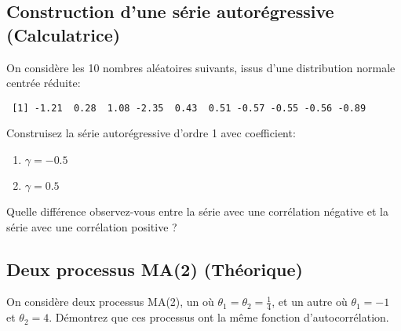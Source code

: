 \documentclass[11pt,english,francais]{article}
\begin{document}
\subsection{Construction d'une série autorégressive (Calculatrice)}
\label{sec:constr-dune-serie}

On considère les 10 nombres aléatoires suivants, issus d'une distribution normale centrée réduite:

\begin{verbatim}
 [1] -1.21  0.28  1.08 -2.35  0.43  0.51 -0.57 -0.55 -0.56 -0.89
\end{verbatim}

Construisez la série autorégressive d'ordre 1 avec coefficient: 
\begin{enumerate}
\item $\gamma = -0.5$
\item $\gamma = 0.5$
\end{enumerate}

Quelle différence observez-vous entre la série avec une corrélation négative et la série avec une corrélation positive ?

\subsection{Deux processus MA(2) (Théorique)}

On considère deux processus MA(2), un où $\theta_1 = \theta_2 = \frac{1}{4}$, et un autre où $\theta_1=-1$ et $\theta_2 = 4$. Démontrez que ces processus ont la même fonction d'autocorrélation.

\clearpage


\end{document}
